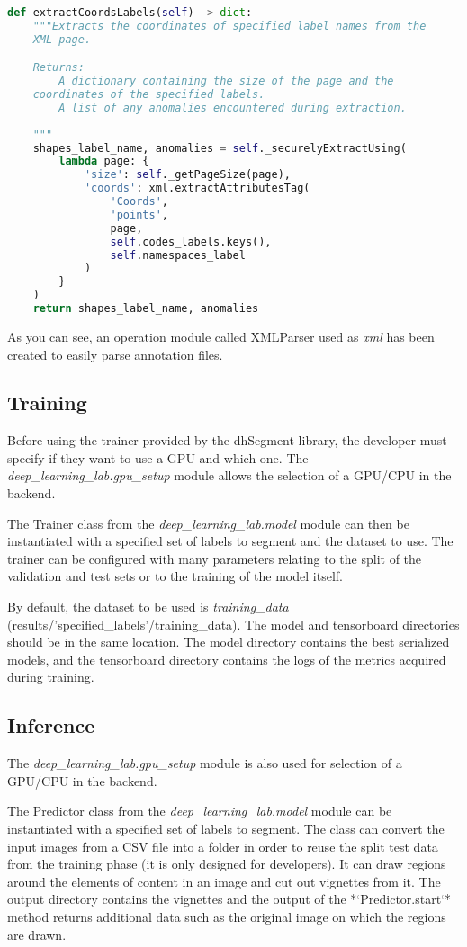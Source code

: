 \documentclass{polytech/polytech}
\numberwithin{figure}{chapter}
\begin{document}
\begin{appendix}
\begin{lstlisting}[language=Python]
def extractCoordsLabels(self) -> dict:
    """Extracts the coordinates of specified label names from the
    XML page.

    Returns:
        A dictionary containing the size of the page and the
	coordinates of the specified labels.
        A list of any anomalies encountered during extraction.
    
    """
    shapes_label_name, anomalies = self._securelyExtractUsing(
        lambda page: {
            'size': self._getPageSize(page),
            'coords': xml.extractAttributesTag(
                'Coords',
                'points',
                page,
                self.codes_labels.keys(),
                self.namespaces_label
            )
        }
    )
    return shapes_label_name, anomalies
\end{lstlisting}

As you can see, an operation module called XMLParser used as {\it xml} has been created to easily parse annotation files.

\subsection{Training}
Before using the trainer provided by the dhSegment library, the developer must specify if they want to use a GPU and which one.
The {\it deep_learning_lab.gpu_setup} module allows the selection of a GPU/CPU in the backend.

The Trainer class from the {\it deep_learning_lab.model} module can then be instantiated with a specified set of labels to segment and the dataset to use.
The trainer can be configured with many parameters relating to the split of the validation and test sets or to the training of the model itself.

By default, the dataset to be used is {\it training_data} (results/'specified_labels'/training_data).
The model and tensorboard directories should be in the same location.
The model directory contains the best serialized models, and the tensorboard directory contains the logs of the metrics acquired during training.

\subsection{Inference}
The {\it deep_learning_lab.gpu_setup} module is also used for selection of a GPU/CPU in the backend.

The Predictor class from the {\it deep_learning_lab.model} module can be instantiated with a specified set of labels to segment.
The class can convert the input images from a CSV file into a folder in order to reuse the split test data from the training phase (it is only designed for developers).
It can draw regions around the elements of content in an image and cut out vignettes from it.
The output directory contains the vignettes and the output of the *`Predictor.start`* method returns additional data such as the original image on which the regions are drawn.


\end{appendix}
\end{document}
